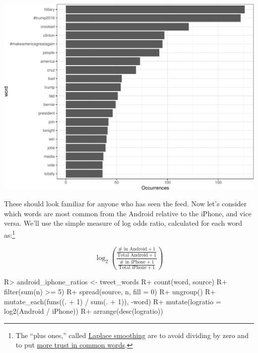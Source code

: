 \documentclass[
]{jss}
\begin{document}
\begin{CodeChunk}


\begin{center}\includegraphics{Live_Demo2_files/figure-latex/tweet_words_plot-1} \end{center}

\end{CodeChunk}

These should look familiar for anyone who has seen the feed. Now let's
consider which words are most common from the Android relative to the
iPhone, and vice versa. We'll use the simple measure of log odds ratio,
calculated for each word as:\footnote{The ``plus ones,'' called
  \href{https://en.wikipedia.org/wiki/Additive_smoothing}{Laplace
  smoothing} are to avoid dividing by zero and to put
  \href{http://varianceexplained.org/r/empirical_bayes_baseball/}{more
  trust in common words}.}

\[\log_2(\frac{\frac{\mbox{\#\ in Android} + 1}{\mbox{Total Android} + 1}}
  {\frac{\mbox{\#\ in iPhone} + 1}{\mbox{Total iPhone} + 1}})\]

\begin{CodeChunk}

\begin{CodeInput}
R> android_iphone_ratios <- tweet_words %
R+   count(word, source) %
R+   filter(sum(n) >= 5) %
R+   spread(source, n, fill = 0) %
R+   ungroup() %
R+   mutate_each(funs((. + 1) / sum(. + 1)), -word) %
R+   mutate(logratio = log2(Android / iPhone)) %
R+   arrange(desc(logratio))
\end{CodeInput}
\end{CodeChunk}
\end{document}
